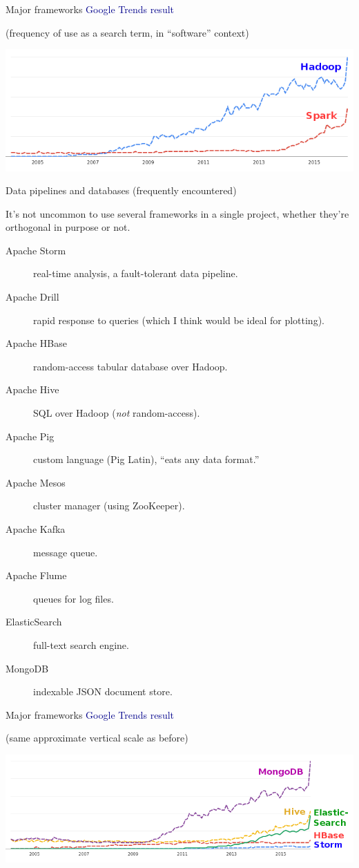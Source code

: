 \documentclass{beamer}
\begin{document}
\begin{frame}{Major frameworks}
\textcolor{darkblue}{Google Trends result}

(frequency of use as a search term, in ``software'' context)

\includegraphics[width=\linewidth]{trends.png}
\end{frame}

\begin{frame}{Data pipelines and databases (frequently encountered)}

It's not uncommon to use several frameworks in a single project, whether they're orthogonal in purpose or not.

\begin{description}
\item[Apache Storm] real-time analysis, a fault-tolerant data pipeline.
\item[Apache Drill] rapid response to queries (which I think would be ideal for plotting).
\item[Apache HBase] random-access tabular database over Hadoop.
\item[Apache Hive] SQL over Hadoop ({\it not} random-access).
\item[Apache Pig] custom language (Pig Latin), ``eats any data format.''
\item[Apache Mesos] cluster manager (using ZooKeeper).
\item[Apache Kafka] message queue.
\item[Apache Flume] queues for log files.
\item[ElasticSearch] full-text search engine.
\item[MongoDB] indexable JSON document store.
\end{description}
\end{frame}

\begin{frame}{Major frameworks}
\textcolor{darkblue}{Google Trends result}

(same approximate vertical scale as before)

\includegraphics[width=\linewidth]{trends2.png}
\end{frame}
\end{document}
